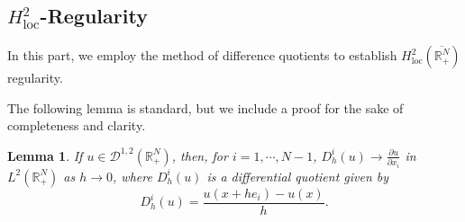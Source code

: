 \documentclass[12pt,reqno]{amsart}
\newtheorem{lemma}[theorem]{Lemma}
\begin{document}
\subsection{$H^2_{\mathrm{loc}}$-Regularity} In this part, we employ the method of difference quotients to establish $H^2_{\mathrm{loc}}(\overline{\mathds{R}^N_+})$ regularity.

The following lemma is standard, but we include a proof for the sake of completeness and clarity.

\begin{lemma}\label{limit dq}If $u \in \mathcal{D}^{1,2}(\mathds{R}^N_+)$, then, for $i=1,\cdots,N-1$, $D_h^i(u) \longrightarrow \frac{\partial u}{\partial x_i}$ in $L^2(\mathds{R}^N_+)$ as $h \longrightarrow 0$, where $D_h^i(u)$ is a differential quotient given by
\begin{equation*}
D_h^i(u)=\frac{u(x+he_i)-u(x)}{h}.
\end{equation*}
\end{lemma}
\end{document}
